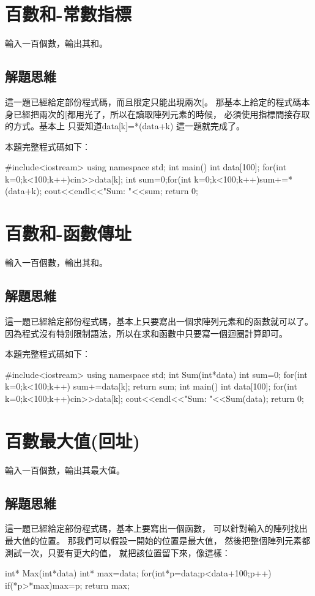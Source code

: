 \section{百數和-常數指標}
輸入一百個數，輸出其和。

\subsection{解題思維}
這一題已經給定部份程式碼，而且限定只能出現兩次[。
那基本上給定的程式碼本身已經把兩次的[都用光了，所以在讀取陣列元素的時候，
必須使用指標間接存取的方式。基本上
只要知道data[k]=*(data+k)
這一題就完成了。

本題完整程式碼如下：	
\begin{cppcode}
#include<iostream>
using namespace std;
int main(){
	int data[100];
	for(int k=0;k<100;k++)cin>>data[k];
	int sum=0;for(int k=0;k<100;k++)sum+=*(data+k);
	cout<<endl<<"Sum: "<<sum;
	return 0;
}
\end{cppcode}


\section{百數和-函數傳址}
輸入一百個數，輸出其和。

\subsection{解題思維}
這一題已經給定部份程式碼，基本上只要寫出一個求陣列元素和的函數就可以了。
因為程式沒有特別限制語法，所以在求和函數中只要寫一個迴圈計算即可。

本題完整程式碼如下：	
\begin{cppcode}
#include<iostream>
using namespace std;
int Sum(int*data){
	int sum=0; 
	for(int k=0;k<100;k++) sum+=data[k];
	return sum;
}
int main(){
	int data[100];
	for(int k=0;k<100;k++)cin>>data[k];
	cout<<endl<<"Sum: "<<Sum(data);
	return 0;
}
\end{cppcode}


\section{百數最大值(回址)}
輸入一百個數，輸出其最大值。

\subsection{解題思維}
這一題已經給定部份程式碼，基本上要寫出一個函數，
可以針對輸入的陣列找出最大值的位置。
那我們可以假設一開始的位置是最大值，
然後把整個陣列元素都測試一次，只要有更大的值，
就把該位置留下來，像這樣：
\begin{inside}
int* Max(int*data){
	int* max=data; 
	for(int*p=data;p<data+100;p++) if(*p>*max)max=p;
	return max;
}
\end{inside}

